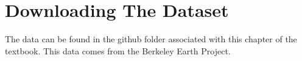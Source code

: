 \section{Downloading The Dataset}

The data can be found in the github folder associated with this chapter of the textbook.
This data comes from the Berkeley Earth Project.
